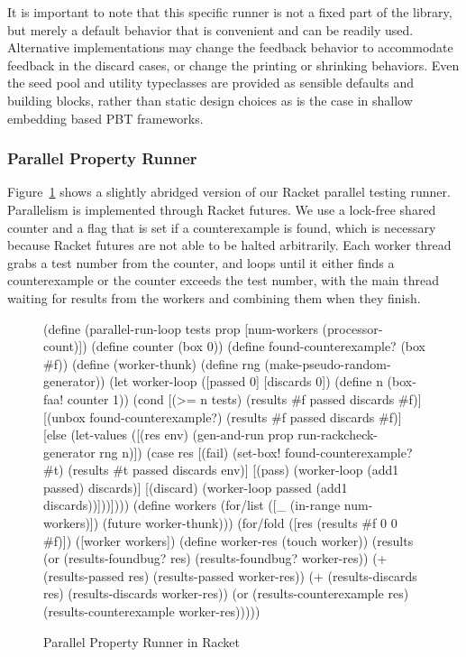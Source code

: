 It is important to note that this specific runner is not a fixed part of the library,
but merely a default behavior that is convenient and can be readily used. Alternative
implementations may change the feedback behavior to accommodate feedback in the discard
cases, or change the printing or shrinking behaviors. Even the seed pool and utility
typeclasses are provided as sensible defaults and building blocks, rather than static
design choices as is the case in shallow embedding based PBT frameworks.
\label{fig:targetloop}

\subsubsection{Parallel Property Runner}

Figure~\ref{fig:par-loop-appendix} shows a slightly abridged version of our Racket
parallel testing runner. Parallelism is implemented through Racket futures. We use a
lock-free shared counter and a flag that is set if a counterexample is found, which is
necessary because Racket futures are not able to be halted arbitrarily. Each worker
thread grabs a test number from the counter, and loops until it either finds a
counterexample or the counter exceeds the test number, with the main thread waiting for
results from the workers and combining them when they finish.

\begin{figure}[h!]
  \begin{code}[language=Racket]
(define (parallel-run-loop tests prop [num-workers (processor-count)])
  (define counter (box 0))
  (define found-counterexample? (box #f))
  (define (worker-thunk)
    (define rng (make-pseudo-random-generator))
    (let worker-loop ([passed 0] [discards 0])
      (define n (box-faa! counter 1))
      (cond
        [(>= n tests) (results #f passed discards #f)]
        [(unbox found-counterexample?) (results #f passed discards #f)]
        [else
         (let-values ([(res env) (gen-and-run prop run-rackcheck-generator rng n)])
           (case res
             [(fail)
              (set-box! found-counterexample? #t)
              (results #t passed discards env)]
             [(pass) (worker-loop (add1 passed) discards)]
             [(discard) (worker-loop passed (add1 discards))]))])))
  (define workers
    (for/list ([_ (in-range num-workers)])
      (future worker-thunk)))
  (for/fold ([res (results #f 0 0 #f)]) ([worker workers])
    (define worker-res (touch worker))
    (results (or (results-foundbug? res) (results-foundbug? worker-res))
             (+ (results-passed res) (results-passed worker-res))
             (+ (results-discards res) (results-discards worker-res))
             (or (results-counterexample res)
                 (results-counterexample worker-res)))))
\end{code}
  \caption{Parallel Property Runner in Racket}
  \label{fig:par-loop-appendix}
\end{figure}

